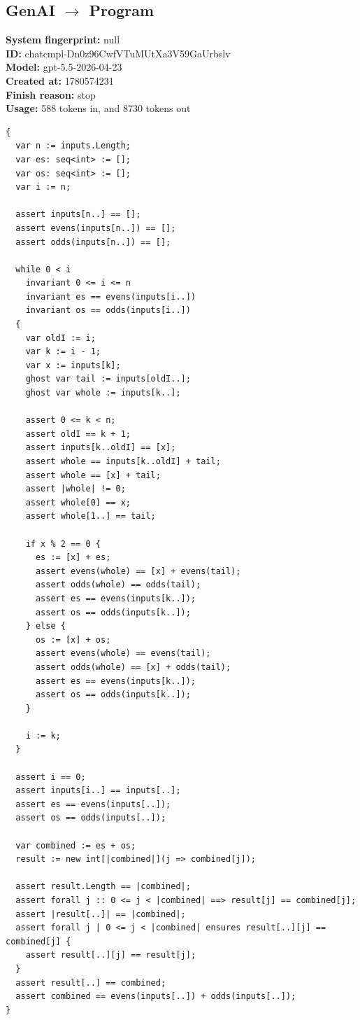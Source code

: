 \documentclass{article}
\begin{document}
\subsection*{GenAI $\rightarrow$ Program}
\textbf{System fingerprint: }null
\\\textbf{ID: }chatcmpl-Dn0z96CwfVTuMUtXa3V59GaUrbslv
\\\textbf{Model: }gpt-5.5-2026-04-23
\\\textbf{Created at: }1780574231
\\\textbf{Finish reason: }stop
\\\textbf{Usage: }588 tokens in, and 8730 tokens out
\begin{lstlisting}
{
  var n := inputs.Length;
  var es: seq<int> := [];
  var os: seq<int> := [];
  var i := n;

  assert inputs[n..] == [];
  assert evens(inputs[n..]) == [];
  assert odds(inputs[n..]) == [];

  while 0 < i
    invariant 0 <= i <= n
    invariant es == evens(inputs[i..])
    invariant os == odds(inputs[i..])
  {
    var oldI := i;
    var k := i - 1;
    var x := inputs[k];
    ghost var tail := inputs[oldI..];
    ghost var whole := inputs[k..];

    assert 0 <= k < n;
    assert oldI == k + 1;
    assert inputs[k..oldI] == [x];
    assert whole == inputs[k..oldI] + tail;
    assert whole == [x] + tail;
    assert |whole| != 0;
    assert whole[0] == x;
    assert whole[1..] == tail;

    if x % 2 == 0 {
      es := [x] + es;
      assert evens(whole) == [x] + evens(tail);
      assert odds(whole) == odds(tail);
      assert es == evens(inputs[k..]);
      assert os == odds(inputs[k..]);
    } else {
      os := [x] + os;
      assert evens(whole) == evens(tail);
      assert odds(whole) == [x] + odds(tail);
      assert es == evens(inputs[k..]);
      assert os == odds(inputs[k..]);
    }

    i := k;
  }

  assert i == 0;
  assert inputs[i..] == inputs[..];
  assert es == evens(inputs[..]);
  assert os == odds(inputs[..]);

  var combined := es + os;
  result := new int[|combined|](j => combined[j]);

  assert result.Length == |combined|;
  assert forall j :: 0 <= j < |combined| ==> result[j] == combined[j];
  assert |result[..]| == |combined|;
  assert forall j | 0 <= j < |combined| ensures result[..][j] == combined[j] {
    assert result[..][j] == result[j];
  }
  assert result[..] == combined;
  assert combined == evens(inputs[..]) + odds(inputs[..]);
}
\end{lstlisting}
\end{document}
